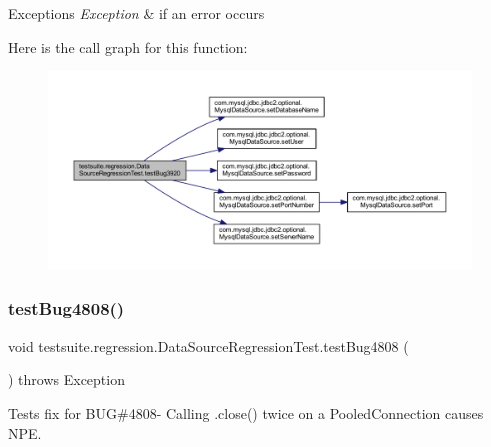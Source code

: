 \begin{DoxyExceptions}{Exceptions}
{\em Exception} & if an error occurs \\
\hline
\end{DoxyExceptions}
Here is the call graph for this function\+:
\nopagebreak
\begin{figure}[H]
\begin{center}
\leavevmode
\includegraphics[width=350pt]{classtestsuite_1_1regression_1_1_data_source_regression_test_ac91c1a6dd9a345d051941b69a3193e57_cgraph}
\end{center}
\end{figure}
\mbox{\label{classtestsuite_1_1regression_1_1_data_source_regression_test_a549c69563bb8fff0dbc64c72d6867f69}} 
\subsubsection{\texorpdfstring{test\+Bug4808()}{testBug4808()}}
{\footnotesize\ttfamily void testsuite.\+regression.\+Data\+Source\+Regression\+Test.\+test\+Bug4808 (\begin{DoxyParamCaption}{ }\end{DoxyParamCaption}) throws Exception}

Tests fix for B\+UG\#4808-\/ Calling .close() twice on a Pooled\+Connection causes N\+PE.


